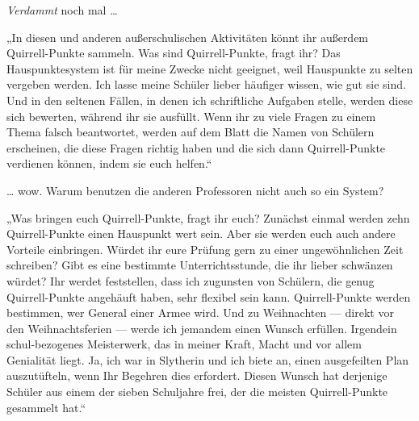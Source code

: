 \emph{Verdammt} noch mal …

„In diesen und anderen außerschulischen Aktivitäten könnt ihr außerdem Quirrell-Punkte sammeln. Was sind Quirrell-Punkte, fragt ihr? Das Hauspunktesystem ist für meine Zwecke nicht geeignet, weil Hauspunkte zu selten vergeben werden. Ich lasse meine Schüler lieber häufiger wissen, wie gut sie sind. Und in den seltenen Fällen, in denen ich schriftliche Aufgaben stelle, werden diese sich bewerten, während ihr sie ausfüllt. Wenn ihr zu viele Fragen zu einem Thema falsch beantwortet, werden auf dem Blatt die Namen von Schülern erscheinen, die diese Fragen richtig haben und die sich dann Quirrell-Punkte verdienen können, indem sie euch helfen.“

… wow. Warum benutzen die anderen Professoren nicht auch so ein System?

„Was bringen euch Quirrell-Punkte, fragt ihr euch? Zunächst einmal werden zehn Quirrell-Punkte einen Hauspunkt wert sein. Aber sie werden euch auch andere Vorteile einbringen. Würdet ihr eure Prüfung gern zu einer ungewöhnlichen Zeit schreiben? Gibt es eine bestimmte Unterrichtsstunde, die ihr lieber schwänzen würdet? Ihr werdet feststellen, dass ich zugunsten von Schülern, die genug Quirrell-Punkte angehäuft haben, sehr flexibel sein kann. Quirrell-Punkte werden bestimmen, wer General einer Armee wird. Und zu Weihnachten — direkt vor den Weihnachtsferien — werde ich jemandem einen Wunsch erfüllen. Irgendein schul-bezogenes Meisterwerk, das in meiner Kraft, Macht und vor allem Genialität liegt. Ja, ich war in Slytherin und ich biete an, einen ausgefeilten Plan auszutüfteln, wenn Ihr Begehren dies erfordert. Diesen Wunsch hat derjenige Schüler aus einem der sieben Schuljahre frei, der die meisten Quirrell-Punkte gesammelt hat.“

